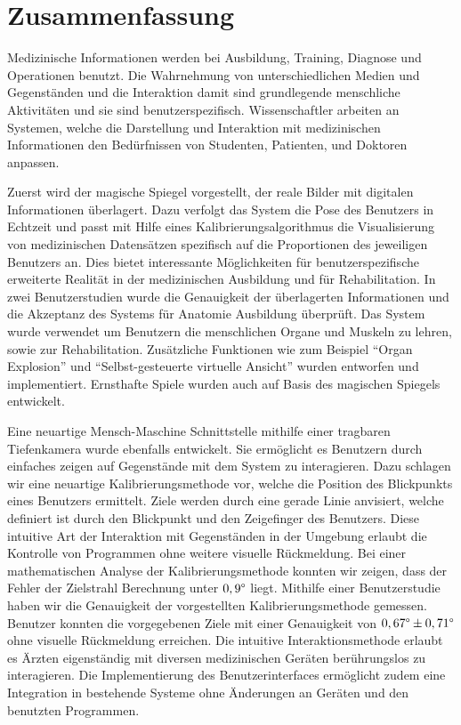 %
\chapter*{Zusammenfassung}
\label{sec:Zusammenfassung}
\vspace*{-15mm}
Medizinische Informationen werden bei Ausbildung, Training, Diagnose und Operationen benutzt. Die Wahrnehmung von unterschiedlichen Medien und Gegenständen und die Interaktion damit sind grundlegende menschliche Aktivitäten und sie sind benutzerspezifisch. Wissenschaftler arbeiten an Systemen, welche die Darstellung und Interaktion mit medizinischen Informationen den Bedürfnissen von Studenten, Patienten, und Doktoren anpassen. 

Zuerst wird der magische Spiegel vorgestellt, der reale Bilder mit digitalen Informationen überlagert. Dazu verfolgt das System die Pose des Benutzers in Echtzeit und passt mit Hilfe eines Kalibrierungsalgorithmus die Visualisierung von medizinischen Datensätzen spezifisch auf die Proportionen des jeweiligen Benutzers an. Dies bietet interessante Möglichkeiten für benutzerspezifische erweiterte Realität in der medizinischen Ausbildung und für Rehabilitation. In zwei Benutzerstudien wurde die Genauigkeit der überlagerten Informationen und die Akzeptanz des Systems für Anatomie Ausbildung überprüft. Das System wurde verwendet um Benutzern die menschlichen Organe und Muskeln zu lehren, sowie zur Rehabilitation. Zusätzliche Funktionen wie zum Beispiel ``Organ Explosion'' und ``Selbst-gesteuerte virtuelle Ansicht'' wurden entworfen und implementiert. Ernsthafte Spiele wurden auch auf Basis des magischen Spiegels entwickelt.

Eine neuartige Mensch-Maschine Schnittstelle mithilfe einer tragbaren Tiefenkamera wurde ebenfalls entwickelt. Sie ermöglicht es Benutzern durch einfaches zeigen auf Gegenstände mit dem System zu interagieren. Dazu schlagen wir eine neuartige Kalibrierungsmethode vor, welche die Position des Blickpunkts eines Benutzers ermittelt. Ziele werden durch eine gerade Linie anvisiert, welche definiert ist durch den Blickpunkt und den Zeigefinger des Benutzers. Diese intuitive Art der Interaktion mit Gegenständen in der Umgebung erlaubt die Kontrolle von Programmen ohne weitere visuelle Rückmeldung. Bei einer mathematischen Analyse der Kalibrierungsmethode konnten wir zeigen, dass der Fehler der Zielstrahl Berechnung unter $0,9\degree$ liegt. Mithilfe einer Benutzerstudie haben wir die Genauigkeit der vorgestellten Kalibrierungsmethode gemessen. Benutzer konnten die vorgegebenen Ziele mit einer Genauigkeit von $0,67\degree \pm 0,71\degree$ ohne visuelle Rückmeldung erreichen. Die intuitive Interaktionsmethode erlaubt es Ärzten eigenständig mit diversen medizinischen Geräten berührungslos zu interagieren. Die Implementierung des Benutzerinterfaces ermöglicht zudem eine Integration in bestehende Systeme ohne Änderungen an Geräten und den benutzten Programmen.

